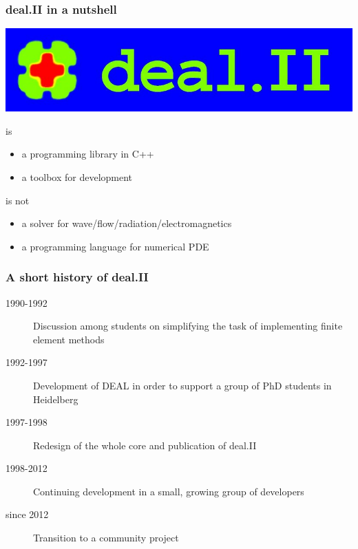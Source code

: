 \begin{frame}
  \frametitle{deal.II in a nutshell}
  \begin{center}
    \includegraphics[height=5ex]{deallogo}
  \end{center}
  is
  \begin{itemize}
  \item a programming library in C++
  \item a toolbox for development
  \end{itemize}
  \pause
  is not
  \begin{itemize}
  \item a solver for wave/flow/radiation/electromagnetics
  \item a programming language for numerical PDE
  \end{itemize}
\end{frame}

\begin{frame}
  \frametitle{A short history of deal.II}
  \begin{description}
  \item[1990-1992] Discussion among students on simplifying the task of implementing finite element methods
  \item[1992-1997] Development of DEAL in order to support a group of PhD students in Heidelberg
  \item[1997-1998] Redesign of the whole core and publication of deal.II
  \item[1998-2012] Continuing development in a small, growing group of developers
  \item[since 2012] Transition to a community project
  \end{description}
\end{frame}

